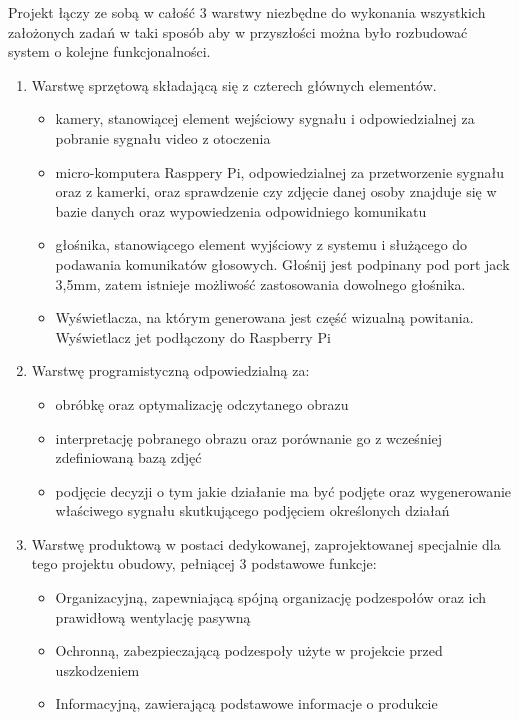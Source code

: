 \documentclass[a4paper,12pt,reqno]{article}
\begin{document}
Projekt łączy ze sobą w całość 3 warstwy niezbędne do wykonania wszystkich założonych zadań w taki sposób aby w przyszłości można było rozbudować system o kolejne funkcjonalności.

\begin{enumerate} %
  \item Warstwę sprzętową składającą się z czterech głównych elementów.
  \begin{itemize}
  	\item kamery, stanowiącej element wejściowy sygnału i odpowiedzialnej za pobranie sygnału video z otoczenia
  	\item micro-komputera Rasppery Pi, odpowiedzialnej za przetworzenie sygnału oraz z kamerki, oraz sprawdzenie czy zdjęcie danej osoby znajduje się w bazie danych oraz wypowiedzenia odpowidniego komunikatu
  	\item głośnika, stanowiącego element wyjściowy z systemu i służącego do podawania komunikatów głosowych. Głośnij jest podpinany pod port jack 3,5mm, zatem istnieje możliwość zastosowania dowolnego głośnika.
  	\item Wyświetlacza, na którym generowana jest część wizualną powitania. Wyświetlacz jet podłączony do Raspberry Pi
  \end{itemize}
  \item Warstwę programistyczną odpowiedzialną za:
  \begin{itemize}
  	\item obróbkę oraz optymalizację odczytanego obrazu
  	\item interpretację pobranego obrazu oraz porównanie go z wcześniej zdefiniowaną bazą zdjęć
  	\item podjęcie decyzji o tym jakie działanie ma być podjęte oraz wygenerowanie właściwego sygnału skutkującego podjęciem określonych działań
  \end{itemize}
  \item Warstwę produktową w postaci dedykowanej, zaprojektowanej specjalnie dla tego projektu obudowy, pełniącej 3 podstawowe funkcje:
  \begin{itemize}
  	\item Organizacyjną, zapewniającą spójną organizację podzespołów oraz ich prawidłową wentylację pasywną
  	\item Ochronną, zabezpieczającą podzespoły użyte w projekcie przed uszkodzeniem
  	\item Informacyjną, zawierającą podstawowe informacje o produkcie
  \end{itemize}
\end{enumerate}
\end{document}
